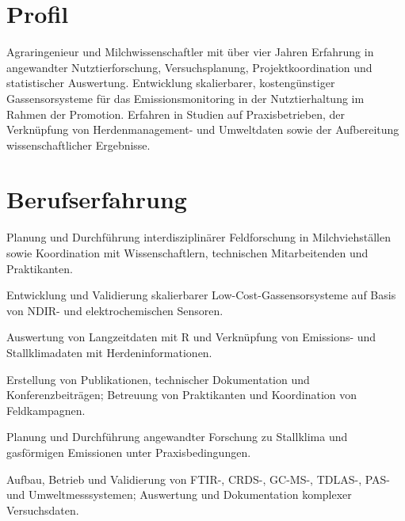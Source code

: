 
\section*{Profil}
Agraringenieur und Milchwissenschaftler mit über vier Jahren Erfahrung in angewandter Nutztierforschung, Versuchsplanung, Projektkoordination und statistischer Auswertung. Entwicklung skalierbarer, kostengünstiger Gassensorsysteme für das Emissionsmonitoring in der Nutztierhaltung im Rahmen der Promotion. Erfahren in Studien auf Praxisbetrieben, der Verknüpfung von Herdenmanagement- und Umweltdaten sowie der Aufbereitung wissenschaftlicher Ergebnisse.

\section*{Berufserfahrung}
\begin{cvitems}
  \item Planung und Durchführung interdisziplinärer Feldforschung in Milchviehställen sowie Koordination mit Wissenschaftlern, technischen Mitarbeitenden und Praktikanten.
  \item Entwicklung und Validierung skalierbarer Low-Cost-Gassensorsysteme auf Basis von NDIR- und elektrochemischen Sensoren.
  \item Auswertung von Langzeitdaten mit R und Verknüpfung von Emissions- und Stallklimadaten mit Herdeninformationen.
  \item Erstellung von Publikationen, technischer Dokumentation und Konferenzbeiträgen; Betreuung von Praktikanten und Koordination von Feldkampagnen.
\end{cvitems}

\begin{cvitems}
  \item Planung und Durchführung angewandter Forschung zu Stallklima und gasförmigen Emissionen unter Praxisbedingungen.
  \item Aufbau, Betrieb und Validierung von FTIR-, CRDS-, GC-MS-, TDLAS-, PAS- und Umweltmesssystemen; Auswertung und Dokumentation komplexer Versuchsdaten.
\end{cvitems}


